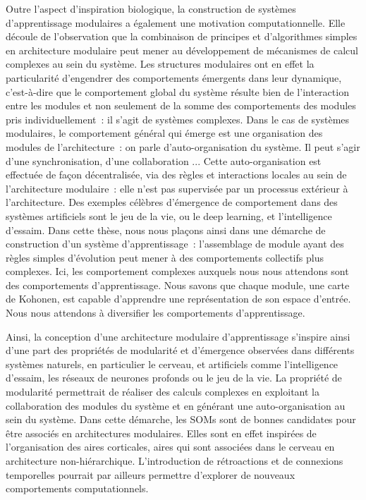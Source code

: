 Outre l'aspect d'inspiration biologique, la construction de systèmes d'apprentissage modulaires a également une motivation computationnelle. 
Elle découle de l'observation que la combinaison de principes et d'algorithmes simples en architecture modulaire peut mener au développement de mécanismes de calcul complexes au sein du système.
Les structures modulaires ont en effet la particularité d'engendrer des comportements émergents dans leur dynamique, c'est-à-dire que le comportement global du système résulte bien de l'interaction entre les modules et non seulement de la somme des comportements des modules pris individuellement~: il s'agit de systèmes complexes.
Dans le cas de systèmes modulaires, le comportement général qui émerge est une organisation des modules de l'architecture~: on parle d'auto-organisation du système. Il peut s'agir d'une synchronisation, d'une collaboration ...
Cette auto-organisation est effectuée de façon décentralisée, via des règles et interactions locales au sein de l'architecture modulaire~: elle n'est pas supervisée par un processus extérieur à l'architecture.
Des exemples célèbres d'émergence de comportement dans des systèmes artificiels sont le jeu de la vie, ou le deep learning, et l'intelligence d'essaim.
Dans cette thèse, nous nous plaçons ainsi dans une démarche de construction d'un système d'apprentissage~: l'assemblage de module ayant des règles simples d'évolution peut mener à des comportements collectifs plus complexes. 
Ici, les comportement complexes auxquels nous nous attendons sont des comportements d'apprentissage. Nous savons que chaque module, une carte de Kohonen, est capable d'apprendre une représentation de son espace d'entrée. Nous nous attendons à diversifier les comportements d'apprentissage.

Ainsi, la conception d'une architecture modulaire d'apprentissage s'inspire ainsi d'une part des propriétés de modularité et d'émergence observées dans différents systèmes naturels, en particulier le cerveau, et artificiels comme l'intelligence d'essaim, les réseaux de neurones profonds ou le jeu de la vie.
La propriété de modularité permettrait de réaliser des calculs complexes en exploitant la collaboration des modules du système et en générant une auto-organisation au sein du système. 
Dans cette démarche, les SOMs sont de bonnes candidates pour être associés en architectures modulaires. Elles sont en effet inspirées de l'organisation des aires corticales, aires qui sont associées dans le cerveau en architecture non-hiérarchique. 
L'introduction de rétroactions et de connexions temporelles pourrait par ailleurs permettre d'explorer de nouveaux comportements computationnels.

